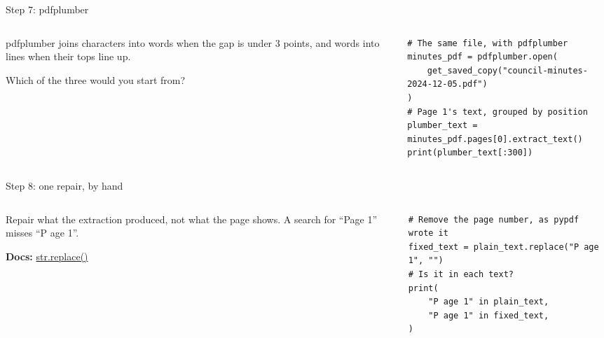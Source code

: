 \documentclass[9pt,aspectratio=169]{beamer}
\begin{document}
\begin{frame}[fragile]{Step 7: pdfplumber}
    \begin{columns}[T]
        \begin{column}{0.37\textwidth}
            pdfplumber joins characters into words when the gap is under 3 points, and words into lines when their tops line up.

            \medskip
            Which of the three would you start from?
        \end{column}
        \begin{column}{0.6\textwidth}
\begin{lstlisting}
# The same file, with pdfplumber
minutes_pdf = pdfplumber.open(
    get_saved_copy("council-minutes-2024-12-05.pdf")
)
# Page 1's text, grouped by position
plumber_text = minutes_pdf.pages[0].extract_text()
print(plumber_text[:300])
\end{lstlisting}
        \end{column}
    \end{columns}
\end{frame}

\begin{frame}[fragile]{Step 8: one repair, by hand}
    \begin{columns}[T]
        \begin{column}{0.37\textwidth}
            Repair what the extraction produced, not what the page shows. A search for ``Page 1'' misses ``P age 1''.

            \medskip
            {\scriptsize\textbf{Docs:} \href{https://docs.python.org/3/library/stdtypes.html\#str.replace}{str.replace()}\par}
        \end{column}
        \begin{column}{0.6\textwidth}
\begin{lstlisting}
# Remove the page number, as pypdf wrote it
fixed_text = plain_text.replace("P age 1", "")
# Is it in each text?
print(
    "P age 1" in plain_text,
    "P age 1" in fixed_text,
)
\end{lstlisting}
        \end{column}
    \end{columns}
\end{frame}
\end{document}
